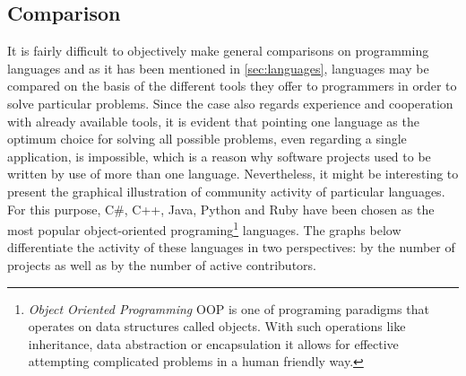 \subsection{Comparison}\label{subsec:lang_compare}
It is fairly difficult to objectively make general comparisons on programming languages and as it has been mentioned in \ref{sec:languages}, languages may be compared on the basis of the different tools they offer to programmers in order to solve particular problems. Since the case also regards experience and cooperation with already available tools, it is evident that pointing one language as the optimum choice for solving all possible problems, even regarding a single application, is impossible, which is a reason why software projects used to be written by use of more than one language. Nevertheless, it might be interesting to present the graphical illustration of community activity of particular languages. For this purpose, C\#, C++, Java, Python and Ruby have been chosen as the most popular object-oriented programing\footnote{\textit{Object Oriented Programming} OOP is one of programing paradigms that operates on data structures called objects. With such operations like inheritance, data abstraction or encapsulation it allows for effective attempting complicated problems in a human friendly way.} languages. The graphs below differentiate the activity of these languages in two perspectives: by the number of projects as well as by the number of active contributors.
